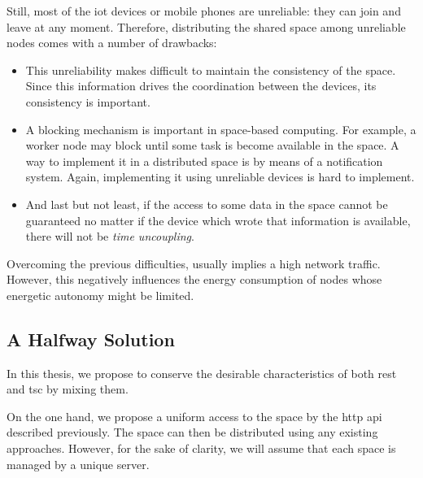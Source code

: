 Still, most of the \ac{iot} devices or mobile phones are unreliable: they can join and leave at any moment.
Therefore, distributing the shared space among unreliable nodes comes with a number of drawbacks:
\begin{itemize}
  \item This unreliability makes difficult to maintain the consistency of the space. %
        Since this information drives the coordination between the devices, its consistency is important.
  \item A blocking mechanism is important in space-based computing.
        For example, a worker node may block until some task is become available in the space.
        A way to implement it in a distributed space is by means of a notification system.
        Again, implementing it using unreliable devices is hard to implement. %
  \item And last but not least, if the access to some data in the space cannot be guaranteed no matter if the device which wrote that information is available, there will not be \emph{time uncoupling}.
\end{itemize}
Overcoming the previous difficulties, usually implies a high network traffic.
However, this negatively influences the energy consumption of nodes whose energetic autonomy might be limited.


\subsection{A Halfway Solution}
\label{sec:halfway_solution}

In this thesis, we propose to conserve the desirable characteristics of both \ac{rest} and \ac{tsc} by mixing them.

On the one hand, we propose a uniform access to the space by the \acs{http} \ac{api} described previously.
The space can then be distributed using any existing approaches. %
However, for the sake of clarity, we will assume that each space is managed by a unique server.


